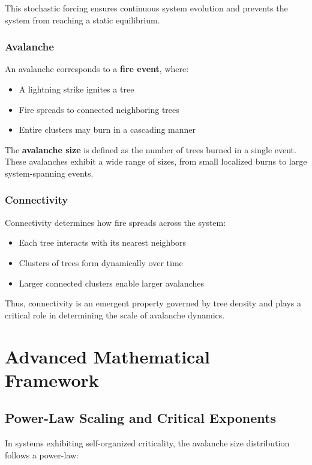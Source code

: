 \documentclass[12pt,a4paper]{article}
\begin{document}
This stochastic forcing ensures continuous system evolution and prevents the system from reaching a static equilibrium.

\subsubsection{Avalanche}

An avalanche corresponds to a \textbf{fire event}, where:

\begin{itemize}
\item A lightning strike ignites a tree
\item Fire spreads to connected neighboring trees
\item Entire clusters may burn in a cascading manner
\end{itemize}

The \textbf{avalanche size} is defined as the number of trees burned in a single event. These avalanches exhibit a wide range of sizes, from small localized burns to large system-spanning events.

\subsubsection{Connectivity}

Connectivity determines how fire spreads across the system:

\begin{itemize}
\item Each tree interacts with its nearest neighbors
\item Clusters of trees form dynamically over time
\item Larger connected clusters enable larger avalanches
\end{itemize}

Thus, connectivity is an emergent property governed by tree density and plays a critical role in determining the scale of avalanche dynamics.

\section{Advanced Mathematical Framework}

\subsection{Power-Law Scaling and Critical Exponents}

In systems exhibiting self-organized criticality, the avalanche size distribution follows a power-law:
\end{document}
